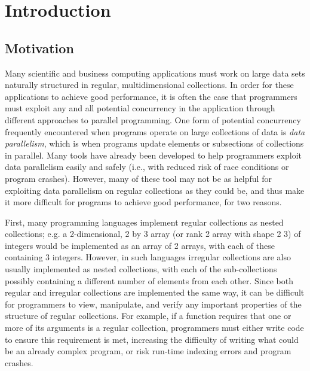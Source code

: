 \chapter{Introduction}

\section{Motivation}
Many scientific and business computing applications must work on large data sets naturally structured in regular, multidimensional collections.
In order for these applications to achieve good performance, 
it is often the case that programmers must exploit any and all potential concurrency in the application 
through different approaches to parallel programming.
One form of potential concurrency frequently encountered when programs operate on large collections of data 
is \textit{data parallelism}, which is when programs update elements or subsections of collections in parallel.
Many tools have already been developed to help programmers exploit data parallelism %
easily and safely (i.e., with reduced risk of race conditions or program crashes). %
However, many of these tool may not be as helpful 
for exploiting data parallelism on regular collections as they could be, 
and thus make it more difficult for programs to achieve good performance, for two reasons.

First, many programming languages implement regular collections as nested collections;
e.g. a 2-dimensional, 2 by 3 array (or rank 2 array with shape 2 3) of integers would be implemented as 
an array of 2 arrays, with each of these containing 3 integers. 
However, in such languages irregular collections are also usually implemented as nested collections, 
with each of the sub-collections possibly containing a different number of elements from each other.
Since both regular and irregular collections are implemented the same way,
it can be difficult for programmers to view, manipulate, and verify 
any important properties of the structure of regular collections.
For example, if a function requires that one or more of its arguments is a regular collection, 
programmers must either write code to ensure this requirement is met,
increasing the difficulty of writing what could be an already complex program, 
or risk run-time indexing errors and program crashes.

